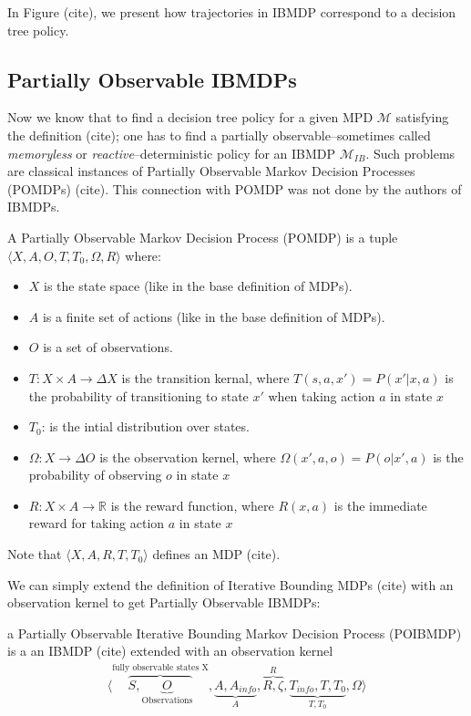 In Figure (cite), we present how trajectories in IBMDP correspond to a decision tree policy.

\subsection{Partially Observable IBMDPs}

Now we know that to find a decision tree policy for a given MPD $\mathcal{M}$ satisfying the definition (cite); one has to find a partially observable--sometimes called \textit{memoryless} or \textit{reactive}--deterministic policy for an IBMDP $\mathcal{M}_{IB}$.
Such problems are classical instances of Partially Observable Markov Decision Processes (POMDPs) (cite). This connection with POMDP was not done by the authors of IBMDPs. 

\begin{definition}
A Partially Observable Markov Decision Process (POMDP) is a tuple $\langle X, A, O, T, T_0, \Omega, R\rangle$ where:
\begin{itemize}
    \item $X$ is the state space (like in the base definition of MDPs).
    \item $A$ is a finite set of actions (like in the base definition of MDPs).
    \item $O$ is a set of observations.
    \item $T: X \times A \rightarrow \Delta X$ is the transition kernal, where $T(s, a, x') = P(x'|x, a)$ is the probability of transitioning to state $x'$ when taking action $a$ in state $x$
    \item $T_0$: is the intial distribution over states. 
    \item $\Omega: X \rightarrow \Delta O$ is the observation kernel, where $\Omega(x', a, o) = P(o|x', a)$ is the probability of observing $o$ in state $x$
    \item $R: X \times A \rightarrow \mathbb{R}$ is the reward function, where $R(x, a)$ is the immediate reward for taking action $a$ in state $x$
\end{itemize}
Note that $\langle X, A, R, T, T_0 \rangle$ defines an MDP (cite).
\end{definition}

We can simply extend the definition of Iterative Bounding MDPs (cite) with an observation kernel to get Partially Observable IBMDPs:
\begin{definition} a Partially Observable Iterative Bounding Markov Decision Process (POIBMDP) is a an IBMDP (cite) extended with an observation kernel 
    \begin{align*}
        \langle \overbrace{S, \underbrace{O}_{\text{Observations}}}^{\text{fully observable states X}}, \underbrace{A, A_{info}}_{A}, \overbrace{R, \zeta}^{R}, \underbrace{T_{info}, T, T_0}_{T, T_0}, \Omega \rangle
    \end{align*}
\end{definition}

